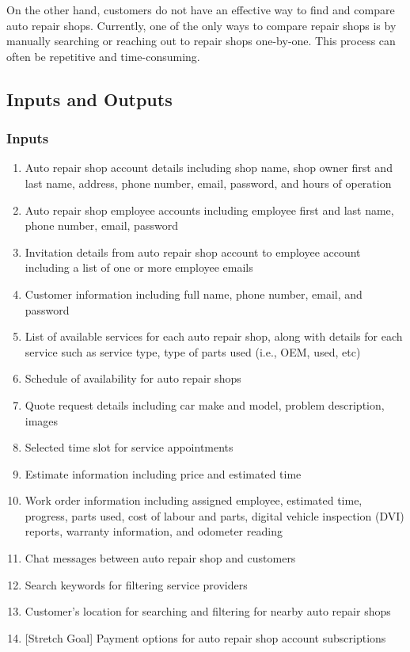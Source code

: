 \documentclass{article}
\begin{document}
On the other hand, customers do not have an effective way to find and compare auto repair shops. 
Currently, one of the only ways to compare repair shops is by manually searching or reaching out to repair shops one-by-one. 
This process can often be repetitive and time-consuming.

\subsection{Inputs and Outputs}
\subsubsection{Inputs}
\begin{enumerate}
    \item Auto repair shop account details including shop name, shop owner first and last name, address, phone number, email, 
    password, and hours of operation
    \item Auto repair shop employee accounts including employee first and last name, phone number, email, password
    \item Invitation details from auto repair shop account to employee account including a list of one or more employee emails
    \item Customer information including full name, phone number, email, and password
    \item List of available services for each auto repair shop, along with details for each service such as service type, 
    type of parts used {(i.e., OEM, used, etc)}
    \item Schedule of availability for auto repair shops
    \item Quote request details including car make and model, problem description, images
    \item Selected time slot for service appointments
    \item Estimate information including price and estimated time
    \item Work order information including assigned employee, estimated time, progress, parts used, cost of labour and parts, 
    digital vehicle inspection {(DVI)} reports, warranty information, and odometer reading
    \item Chat messages between auto repair shop and customers
    \item Search keywords for filtering service providers
    \item Customer's location for searching and filtering for nearby auto repair shops
    \item {[Stretch Goal]} Payment options for auto repair shop account subscriptions
\end{enumerate}
\end{document}
